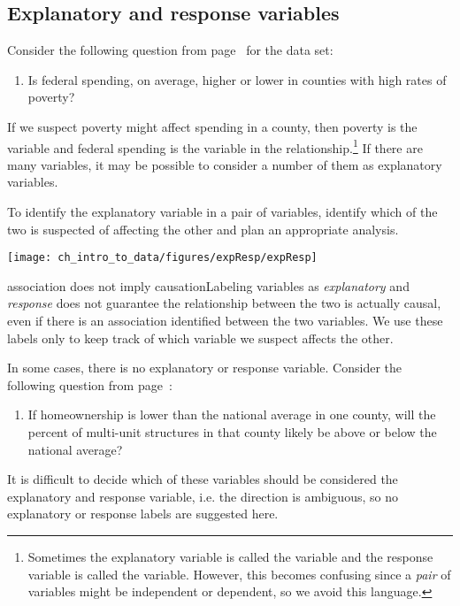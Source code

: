 
\subsection{Explanatory and response variables}
\label{explanatoryAndResponse}


Consider the following question from page~\pageref{fedSpendingPovertyQuestion} for the  data set:
\begin{enumerate}
\item[(1)] 
	Is federal spending, on average, higher or lower in counties with high rates of poverty?
\end{enumerate}
If we suspect poverty might affect spending in a county, then poverty is the  variable and federal spending is the  variable in the relationship.\footnote{Sometimes the explanatory variable is called the  variable and the response variable is called the  variable. However, this becomes confusing since a \emph{pair} of variables might be independent or dependent, so we avoid this language.} If there are many variables, it may be possible to consider a number of them as explanatory variables.

\begin{tipBox}{
To identify the explanatory variable in a pair of variables, identify which of the two is suspected of affecting the other and plan an appropriate analysis.

\hspace{10mm}\texttt{[image: ch\_intro\_to\_data/figures/expResp/expResp]}}
\end{tipBox}

\begin{caution}{association does not imply causation}{Labeling variables as \emph{explanatory} and \emph{response} does not guarantee the relationship between the two is actually causal, even if there is an association identified between the two variables. We use these labels only to keep track of which variable we suspect affects the other.}
\end{caution}

In some cases, there is no explanatory or response variable. Consider the following question from page~\pageref{ownershipMultiUnitQuestion}:
\begin{enumerate}
\item[(2)] 
	If homeownership is lower than the national average in one county, will the percent of multi-unit structures in that county likely be above or below the national average?
\end{enumerate}
It is difficult to decide which of these variables should be considered the explanatory and response variable, i.e. the direction is ambiguous, so no explanatory or response labels are suggested here.

